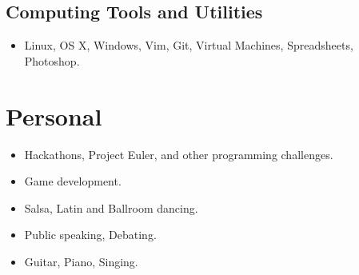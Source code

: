 \documentclass{jcgcv}
\begin{document}
\begin{column}
\subsection{Computing Tools and Utilities}
\begin{itemize}
  \item Linux, OS X, Windows, Vim, Git, Virtual Machines, Spreadsheets, Photoshop.
\end{itemize}



\section{Personal}

\begin{itemize}
  \item Hackathons, Project Euler, and other programming challenges.
  \item Game development.
  \item Salsa, Latin and Ballroom dancing.
  \item Public speaking, Debating.
  \item Guitar, Piano, Singing.
\end{itemize}


\end{column}
\end{document}
